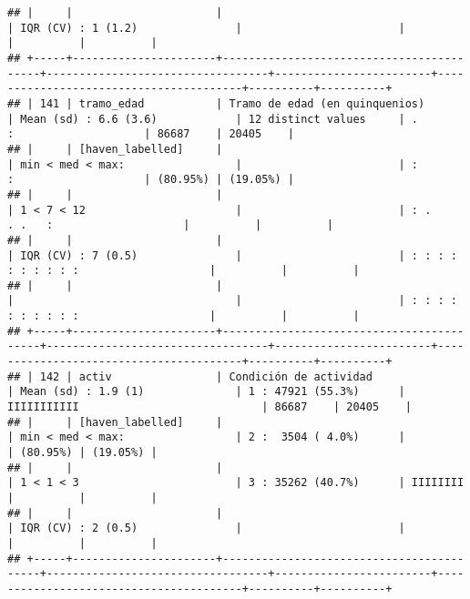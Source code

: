 \documentclass[]{article}
\begin{document}
\begin{verbatim}
## |     |                      |                                          | IQR (CV) : 1 (1.2)               |                        |                                        |          |          |
## +-----+----------------------+------------------------------------------+----------------------------------+------------------------+----------------------------------------+----------+----------+
## | 141 | tramo_edad           | Tramo de edad (en quinquenios)           | Mean (sd) : 6.6 (3.6)            | 12 distinct values     | .                 :                    | 86687    | 20405    |
## |     | [haven_labelled]     |                                          | min < med < max:                 |                        | :                 :                    | (80.95%) | (19.05%) |
## |     |                      |                                          | 1 < 7 < 12                       |                        | : .         . .   :                    |          |          |
## |     |                      |                                          | IQR (CV) : 7 (0.5)               |                        | : : : : : : : : : :                    |          |          |
## |     |                      |                                          |                                  |                        | : : : : : : : : : :                    |          |          |
## +-----+----------------------+------------------------------------------+----------------------------------+------------------------+----------------------------------------+----------+----------+
## | 142 | activ                | Condición de actividad                   | Mean (sd) : 1.9 (1)              | 1 : 47921 (55.3%)      | IIIIIIIIIII                            | 86687    | 20405    |
## |     | [haven_labelled]     |                                          | min < med < max:                 | 2 :  3504 ( 4.0%)      |                                        | (80.95%) | (19.05%) |
## |     |                      |                                          | 1 < 1 < 3                        | 3 : 35262 (40.7%)      | IIIIIIII                               |          |          |
## |     |                      |                                          | IQR (CV) : 2 (0.5)               |                        |                                        |          |          |
## +-----+----------------------+------------------------------------------+----------------------------------+------------------------+----------------------------------------+----------+----------+

\end{verbatim}
\end{document}
